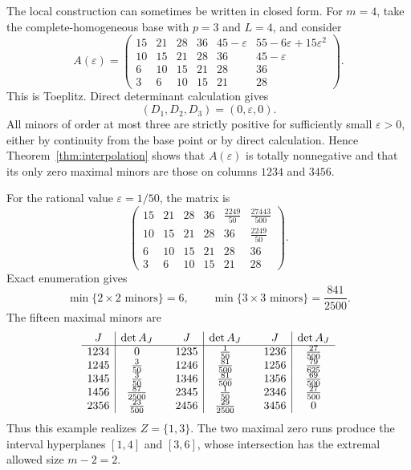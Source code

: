 \documentclass{amsart}
\numberwithin{equation}{section}
\theoremstyle{definition}
\theoremstyle{remark}
\begin{document}
The local construction can sometimes be written in closed form.  For $m=4$, take the complete-homogeneous base with $p=3$ and $L=4$, and consider
\begin{equation}\label{eq:example-family}
 A(\varepsilon)=
 \begin{pmatrix}
 15&21&28&36&45-\varepsilon&55-6\varepsilon+15\varepsilon^2\\
 10&15&21&28&36&45-\varepsilon\\
 6&10&15&21&28&36\\
 3&6&10&15&21&28
 \end{pmatrix}.
\end{equation}
This is Toeplitz.  Direct determinant calculation gives
\begin{equation}\label{eq:example-D}
 (D_1,D_2,D_3)=(0,\varepsilon,0).
\end{equation}
All minors of order at most three are strictly positive for sufficiently small $\varepsilon>0$, either by continuity from the base point or by direct calculation.  Hence Theorem~\ref{thm:interpolation} shows that $A(\varepsilon)$ is totally nonnegative and that its only zero maximal minors are those on columns $1234$ and $3456$.

For the rational value $\varepsilon=1/50$, the matrix is
\[
 \begin{pmatrix}
 15&21&28&36&\frac{2249}{50}&\frac{27443}{500}\\
 10&15&21&28&36&\frac{2249}{50}\\
 6&10&15&21&28&36\\
 3&6&10&15&21&28
 \end{pmatrix}.
\]
Exact enumeration gives
\[
 \min\{2\times2\text{ minors}\}=6,
 \qquad
 \min\{3\times3\text{ minors}\}=\frac{841}{2500}.
\]
The fifteen maximal minors are
\[
\begin{array}{c|c@{\qquad}c|c@{\qquad}c|c}
J&\det A_J&J&\det A_J&J&\det A_J\\ \hline
1234&0&1235&\frac1{50}&1236&\frac{27}{500}\\
1245&\frac3{50}&1246&\frac{81}{500}&1256&\frac{79}{625}\\
1345&\frac3{50}&1346&\frac{81}{500}&1356&\frac{69}{500}\\
1456&\frac{87}{2500}&2345&\frac1{50}&2346&\frac{27}{500}\\
2356&\frac{23}{500}&2456&\frac{29}{2500}&3456&0
\end{array}
\]
Thus this example realizes $Z=\{1,3\}$.  The two maximal zero runs produce the interval hyperplanes $[1,4]$ and $[3,6]$, whose intersection has the extremal allowed size $m-2=2$.
\end{document}
